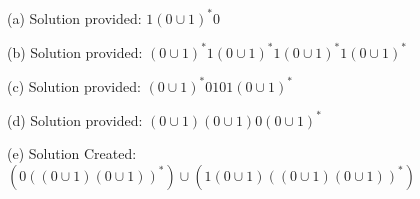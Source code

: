 
(a) Solution provided: $1 (0 \cup 1)^* 0$

(b) Solution provided: $(0 \cup 1)^* 1 (0 \cup 1)^* 1 (0 \cup 1)^* 1 (0 \cup 1)^*$

(c) Solution provided: $(0 \cup 1)^* 0101 (0 \cup 1)^*$

(d) Solution provided: $(0 \cup 1)(0 \cup 1)0(0 \cup 1)^*$

(e) Solution Created:  $(0 ((0 \cup 1) (0 \cup 1))^*) \cup (1 (0 \cup 1)((0 \cup 1) (0 \cup 1))^*)$

